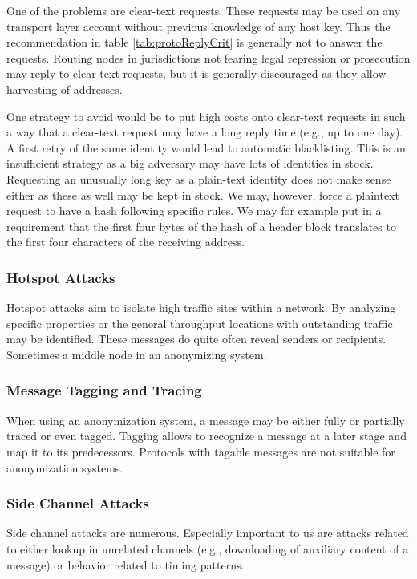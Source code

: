 One of the problems are clear-text requests. These requests may be used on any transport layer account without previous knowledge of any host key. Thus the recommendation in table \ref{tab:protoReplyCrit} is generally not to answer the requests. Routing nodes in jurisdictions not fearing legal repression or prosecution may reply to clear text requests, but it is generally discouraged as they allow harvesting of addresses.

One strategy to avoid would be to put high costs onto clear-text requests in such a way that a clear-text request may have a long reply time (e.g., up to one day). A first retry of the same identity would lead to automatic blacklisting. This is an insufficient strategy as a big adversary may have lots of identities in stock. Requesting an unusually long key as a plain-text identity does not make sense either as these as well may be kept in stock. We may, however, force a plaintext request to have a hash following specific rules. We may for example put in a requirement that the first four bytes of the hash of a header block translates to the first four characters of the receiving address.


\subsubsection{Hotspot Attacks}
Hotspot attacks aim to isolate high traffic sites within a network. By analyzing specific properties or the general throughput locations with outstanding traffic may be identified. These messages do quite often reveal senders or recipients. Sometimes a middle node in an anonymizing system. 

\subsubsection{Message Tagging and Tracing}
When using an anonymization system, a message may be either fully or partially traced or even tagged. Tagging allows to recognize a message at a later stage and map it to its predecessors. Protocols with tagable messages are not suitable for anonymization systems.

\subsubsection{Side Channel Attacks}
Side channel attacks are numerous. Especially important to us are attacks related to either lookup in unrelated channels (e.g., downloading of auxiliary content of a message) or behavior related to timing patterns.

